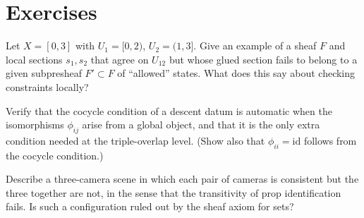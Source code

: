 \section*{Exercises}

\begin{exercise}
Let $X=[0,3]$ with $U_1=[0,2)$, $U_2=(1,3]$. Give an example of a sheaf $F$ and local sections $s_1,s_2$ that agree on $U_{12}$ but whose glued section fails to belong to a given subpresheaf $F'\subset F$ of ``allowed'' states. What does this say about checking constraints locally?
\end{exercise}

\begin{exercise}
Verify that the cocycle condition of a descent datum is automatic when the isomorphisms $\phi_{ij}$ arise from a global object, and that it is the only extra condition needed at the triple-overlap level. (Show also that $\phi_{ii}=\mathrm{id}$ follows from the cocycle condition.)
\end{exercise}

\begin{exercise}
Describe a three-camera scene in which each pair of cameras is consistent but the three together are not, in the sense that the transitivity of prop identification fails. Is such a configuration ruled out by the sheaf axiom for sets?
\end{exercise}
